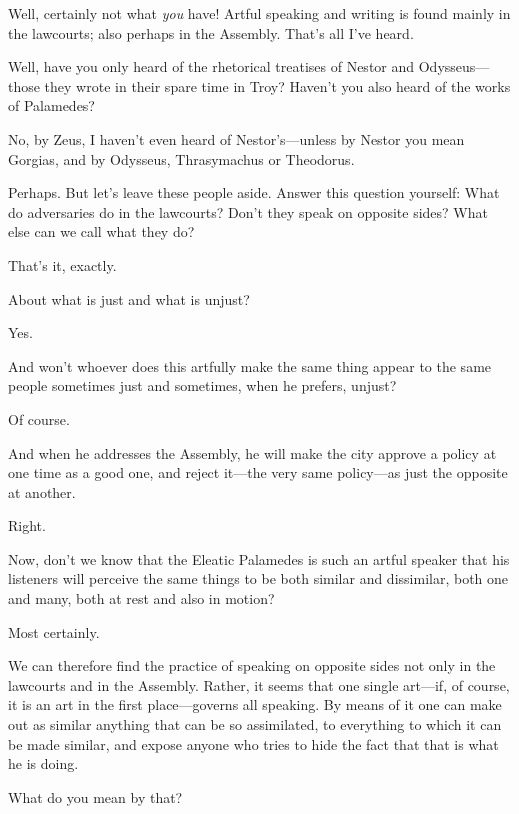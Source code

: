 \sayphaedrus Well, certainly not what {\em you} have! Artful speaking and
writing is found mainly in the lawcourts; also perhaps in the Assembly.
That's all I've heard.

\saysocrates Well, have you only heard of the rhetorical treatises of
Nestor and Odysseus---those they wrote in their spare time in Troy?
Haven't you also heard of the works of
Palamedes?

\sayphaedrus No, by Zeus, I haven't even heard of Nestor's---unless
by Nestor you mean Gorgias, and by Odysseus, Thrasymachus or
Theodorus.

\saysocrates Perhaps. But let's leave these people aside. Answer this
question yourself: What do adversaries do in the lawcourts? Don't they
speak on opposite sides? What else can we call what they do?

\sayphaedrus That's it, exactly.

\saysocrates About what is just and what is unjust?

\sayphaedrus Yes.

\saysocrates And won't whoever does this artfully make the same
thing appear to the same people sometimes just and sometimes, when he
prefers, unjust?

\sayphaedrus Of course.

\saysocrates And when he addresses the Assembly, he will make the city
approve a policy at one time as a good one, and reject it---the very
same policy---as just the opposite at another.

\sayphaedrus Right.

\saysocrates Now, don't we know that the Eleatic Palamedes is such an
artful speaker that his listeners will perceive the same things to be
both similar and dissimilar, both one and many, both at rest and also in
motion?

\sayphaedrus Most certainly.

\saysocrates We can therefore find the practice of speaking on opposite
sides not only in the lawcourts and in the Assembly. Rather, it
seems that one single art---if, of course, it is an art in the first
place---governs all speaking. By means of it one can make out as similar
anything that can be so assimilated, to everything to which it can be
made similar, and expose anyone who tries to hide the fact that that is
what he is doing.

\sayphaedrus What do you mean by that?

